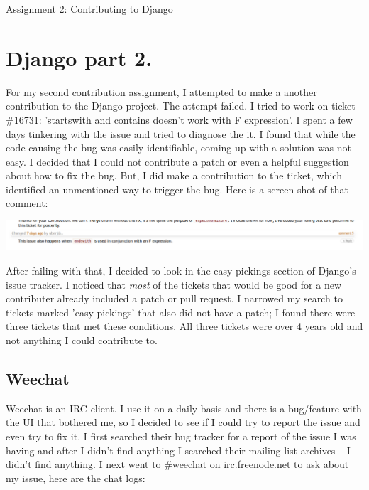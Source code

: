 \documentclass[12pt]{article}
\def\title{Assignment 2: Contributing to Django}
\begin{document}
\begin{center}
\underline{
\large{\title}
}
\end{center}
\singlespacing

\section{Django part 2.}
For my second contribution assignment, I attempted to make a another contribution to the Django
project. The attempt failed. I tried to work on ticket \#16731: 'startswith and contains
doesn't work with F expression'. I spent a few days tinkering with the issue and tried to diagnose
the it. I found that while the code causing the bug was easily identifiable, coming up with a
solution was not easy. I decided that I could not contribute a patch or even a helpful
suggestion about how to fix the bug. But, I did make a contribution to the ticket, which
identified an unmentioned way to trigger the bug. Here is a screen-shot of that comment:

\includegraphics[width=6.5in]{django_fail}

After failing with that, I decided to look in the easy pickings section of Django's issue tracker. I
noticed that \emph{most} of the tickets that would be good for a new contributer already included a
patch or pull request. I narrowed my search to tickets marked 'easy pickings' that also did not
have a patch; I found there were three tickets that met these conditions. All three tickets
were over 4 years old and not anything I could contribute to.

\subsection{Weechat}
Weechat is an IRC client. I use it on a daily basis and there is a bug/feature with the UI that
bothered me, so I decided to see if I could try to report the issue and even try to fix it. I
first searched their bug tracker for a report of the issue I was having and after I didn't find
anything I searched their mailing list archives -- I didn't find anything. I next went to \#weechat
on irc.freenode.net to ask about my issue, here are the chat logs:
\end{document}
